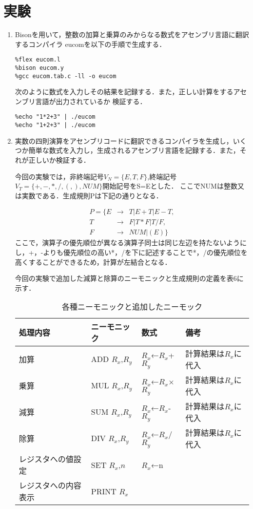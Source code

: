 \documentclass[a4j]{jsarticle}  %
\begin{document}
\section{実験}
\begin{enumerate}
\item Bisonを用いて，整数の加算と乗算のみからなる数式をアセンブリ言語に翻訳するコンパイラ
eucomを以下の手順で生成する．
\begin{screen}
\begin{verbatim}
%flex eucom.l
%bison eucom.y
%gcc eucom.tab.c -ll -o eucom
\end{verbatim}
\end{screen}
次のように数式を入力しその結果を記録する．また，正しい計算をするアセンブリ言語が出力されているか
検証する．
\begin{screen}
\begin{verbatim}
%echo "1*2+3" | ./eucom
%echo "1+2+3" | ./eucom
\end{verbatim}
\end{screen}
\item 実数の四則演算をアセンブリコードに翻訳できるコンパイラを生成し，いくつか簡単な数式を入力し，生成されるアセンブリ言語を記録する．また，それが正しいか検証する．

今回の実験では，非終端記号$V_N=\{E,T,F\}$,終端記号$V_T=\{+,-,*,/,(,),NUM\}$開始記号をS=Eとした．
ここでNUMは整数又は実数である．生成規則Pは下記の通りとなる．

\begin{eqnarray*}
P=\{E&→&T|E+T|E-T, \\
T&→&F|T*F|T/F,\\
F&→&NUM|(E)\} 
\end{eqnarray*}
ここで，演算子の優先順位が異なる演算子同士は同じ左辺を持たないようにし，+，-よりも優先順位の高い*，/を下に記述することで*，/の優先順位を高くすることができるため，計算が左結合となる．

今回の実験で追加した減算と除算のニーモニックと生成規則の定義を表6に示す．

\begin{table}[htb]
  \begin{center}
    \caption{各種ニーモニックと追加したニーモック}
\begin{tabular}{l|l|l|l} \hline
処理内容 & ニーモニック & 数式 & 備考 \\ \hline
加算 & ADD $R_x$,$R_y$ & $R_x$←$R_x$+$R_y$ & 計算結果は$R_x$に代入 \\
乗算 & MUL $R_x$,$R_y$ & $R_x$←$R_x$×$R_y$ & 計算結果は$R_x$に代入 \\
減算 & SUM $R_x$,$R_y$ & $R_x$←$R_x$-$R_y$ & 計算結果は$R_x$に代入 \\
除算 & DIV $R_x$,$R_y$ & $R_x$←$R_x$/$R_y$ & 計算結果は$R_x$に代入 \\
レジスタへの値設定 & SET $R_x$,$n$ & $R_x$←n & \\
レジスタへの内容表示 & PRINT $R_x$ & & \\ \hline
\end{tabular} 
\end{center}
\end{table}

\end{enumerate}
\end{document}
